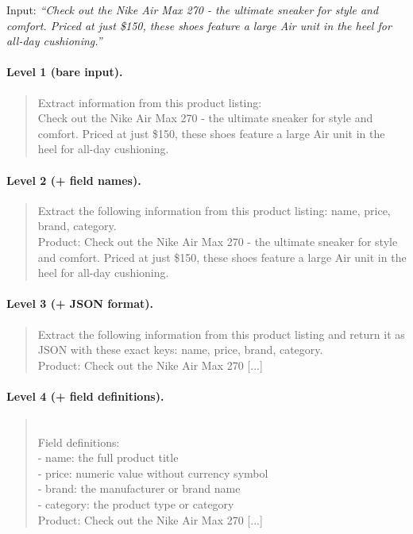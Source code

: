 Input: \textit{``Check out the Nike Air Max 270 - the ultimate sneaker for
style and comfort. Priced at just \$150, these shoes feature a large Air
unit in the heel for all-day cushioning.''}

\paragraph{Level 1 (bare input).}
\begin{quote}\small\ttfamily
Extract information from this product listing:\\
Check out the Nike Air Max 270 - the ultimate sneaker for style and comfort.
Priced at just \$150, these shoes feature a large Air unit in the heel for
all-day cushioning.
\end{quote}

\paragraph{Level 2 (+ field names).}
\begin{quote}\small\ttfamily
Extract the following information from this product listing: name, price,
brand, category.\\[4pt]
Product: Check out the Nike Air Max 270 - the ultimate sneaker for style
and comfort. Priced at just \$150, these shoes feature a large Air unit
in the heel for all-day cushioning.
\end{quote}

\paragraph{Level 3 (+ JSON format).}
\begin{quote}\small\ttfamily
Extract the following information from this product listing and return it
as JSON with these exact keys: name, price, brand, category.\\[4pt]
Product: Check out the Nike Air Max 270 [...]
\end{quote}

\paragraph{Level 4 (+ field definitions).}
\begin{quote}\small\ttfamily
[...as L3, plus:]\\[4pt]
Field definitions:\\
- name: the full product title\\
- price: numeric value without currency symbol\\
- brand: the manufacturer or brand name\\
- category: the product type or category\\[4pt]
Product: Check out the Nike Air Max 270 [...]
\end{quote}

